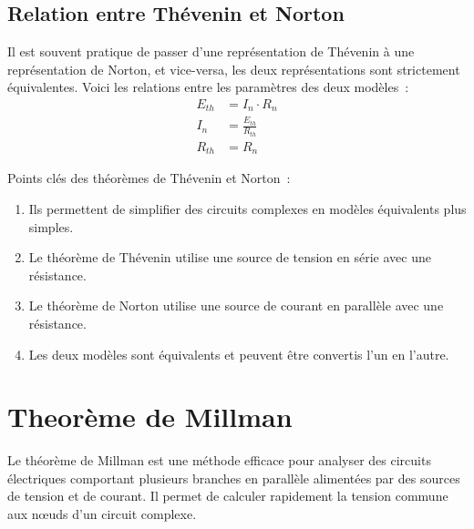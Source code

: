 \subsection{Relation entre Th\'evenin et Norton}
Il est souvent pratique de passer d'une repr\'esentation de Th\'evenin à une repr\'esentation de Norton, et vice-versa, les deux repr\'esentations sont strictement \'equivalentes. Voici les relations entre les param\`etres des deux mod\`eles~:
\begin{align*}
  E_{th} & = I_{n} \cdot R_{n} \\
  I_{n} & = \frac{E_{th}}{R_{th}} \\
  R_{th} & = R_{n}
\end{align*}
\begin{Note}
	Points cl\'es des th\'eor\`emes de Th\'evenin et Norton~:
    \begin{enumerate}
        \item Ils permettent de simplifier des circuits complexes en mod\`eles \'equivalents plus simples.
        \item Le th\'eor\`eme de Th\'evenin utilise une source de tension en s\'erie avec une r\'esistance.
        \item Le th\'eor\`eme de Norton utilise une source de courant en parall\`ele avec une r\'esistance.
        \item Les deux mod\`eles sont \'equivalents et peuvent \^etre convertis l'un en l'autre.
    \end{enumerate}
\end{Note}

\section{Theor\`eme de Millman} \label{subsec:millman}
Le th\'eor\`eme de Millman est une m\'ethode efficace pour analyser des circuits \'electriques comportant plusieurs branches en parall\`ele aliment\'ees par des sources de tension et de courant. Il permet de calculer rapidement la tension commune aux nœuds d'un circuit complexe.
